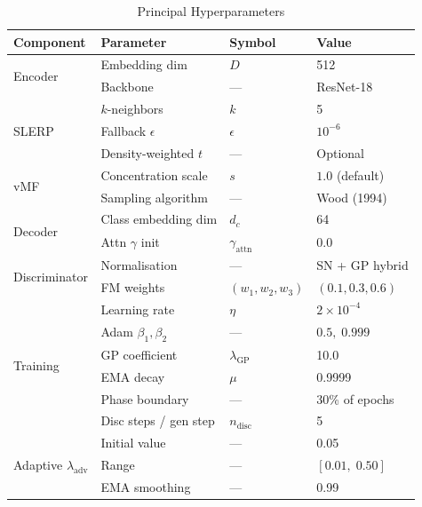 \documentclass[12pt,letterpaper]{article}
\begin{document}
\begin{table}[H]
\centering
\caption{Principal Hyperparameters}
\label{tab:hyper}
\small
\begin{tabular}{@{}llll@{}}
\toprule
\textbf{Component} & \textbf{Parameter} & \textbf{Symbol} & \textbf{Value} \\
\midrule
\multirow{2}{*}{Encoder}
  & Embedding dim     & $D$                       & 512 \\
  & Backbone          & —                         & ResNet-18 \\
\midrule
\multirow{3}{*}{SLERP}
  & $k$-neighbors     & $k$                       & 5 \\
  & Fallback $\epsilon$ & $\epsilon$              & $10^{-6}$ \\
  & Density-weighted $t$ & —                      & Optional \\
\midrule
\multirow{2}{*}{vMF}
  & Concentration scale & $s$                     & $1.0$ (default) \\
  & Sampling algorithm  & —                       & Wood (1994) \\
\midrule
\multirow{2}{*}{Decoder}
  & Class embedding dim & $d_c$                   & 64 \\
  & Attn $\gamma$ init  & $\gamma_{\text{attn}}$  & $0.0$ \\
\midrule
\multirow{2}{*}{Discriminator}
  & Normalisation       & —                       & SN + GP hybrid \\
  & FM weights          & $(w_1,w_2,w_3)$         & $(0.1,0.3,0.6)$ \\
\midrule
\multirow{6}{*}{Training}
  & Learning rate       & $\eta$                  & $2 \times 10^{-4}$ \\
  & Adam $\beta_1,\beta_2$ & —                   & $0.5,\; 0.999$ \\
  & GP coefficient      & $\lambda_{\text{GP}}$   & 10.0 \\
  & EMA decay           & $\mu$                   & 0.9999 \\
  & Phase boundary      & —                       & 30\% of epochs \\
  & Disc steps / gen step & $n_{\text{disc}}$     & 5 \\
\midrule
\multirow{3}{*}{Adaptive $\lambda_{\text{adv}}$}
  & Initial value       & —                       & 0.05 \\
  & Range               & —                       & $[0.01,\; 0.50]$ \\
  & EMA smoothing       & —                       & 0.99 \\
\bottomrule
\end{tabular}
\end{table}
\end{document}
